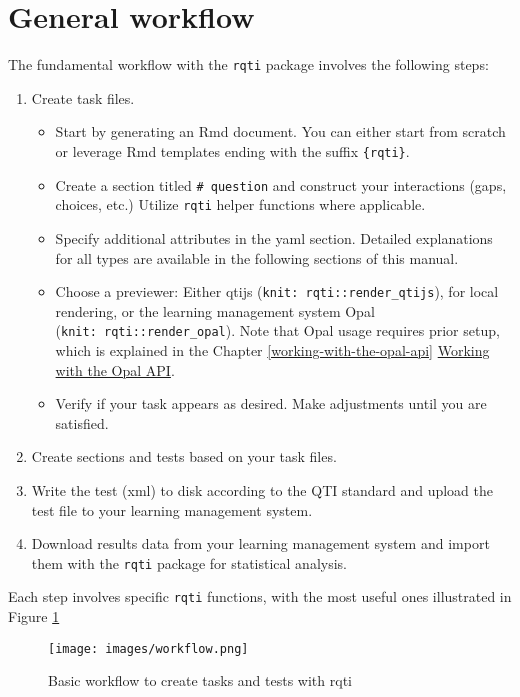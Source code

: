 \documentclass[twoside]{tufte-book}
\providecommand{\tightlist}{%
  \setlength{\itemsep}{0pt}\setlength{\parskip}{0pt}}
\begin{document}
\section{General workflow}\label{general-workflow}

The fundamental workflow with the \texttt{rqti} package involves the following steps:

\begin{enumerate}
\def\labelenumi{\arabic{enumi}.}
\tightlist
\item
  Create task files.

  \begin{itemize}
  \tightlist
  \item
    Start by generating an Rmd document. You can either start from scratch or leverage Rmd templates ending with the suffix \texttt{\{rqti\}}.
  \item
    Create a section titled \texttt{\#\ question} and construct your interactions (gaps, choices, etc.) Utilize \texttt{rqti} helper functions where applicable.
  \item
    Specify additional attributes in the yaml section. Detailed explanations for all types are available in the following sections of this manual.
  \item
    Choose a previewer: Either qtijs (\texttt{knit:\ rqti::render\_qtijs}), for local rendering, or the learning management system Opal (\texttt{knit:\ rqti::render\_opal}). Note that Opal usage requires prior setup, which is explained in the Chapter \ref{working-with-the-opal-api} \href{articles/api_opal.html}{Working with the Opal API}.
  \item
    Verify if your task appears as desired. Make adjustments until you are satisfied.
  \end{itemize}
\item
  Create sections and tests based on your task files.
\item
  Write the test (xml) to disk according to the QTI standard and upload the test file to your learning management system.
\item
  Download results data from your learning management system and import them with the \texttt{rqti} package for statistical analysis.
\end{enumerate}

Each step involves specific \texttt{rqti} functions, with the most useful ones illustrated in Figure \ref{workflow}

\begin{figure}
\centering
\texttt{[image: images/workflow.png]}
\caption{\label{workflow}Basic workflow to create tasks and tests with rqti}
\end{figure}
\end{document}
